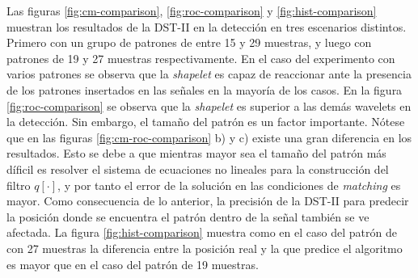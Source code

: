 Las figuras \ref{fig:cm-comparison}, \ref{fig:roc-comparison} y \ref{fig:hist-comparison} 
muestran los resultados de la DST-II en la detección en tres escenarios distintos.
Primero con un grupo de patrones de entre 15 y 29 muestras, y luego con patrones de 19 y 27 
muestras respectivamente. En el caso del experimento con varios patrones se observa que 
la \textit{shapelet} es capaz de reaccionar ante la presencia de los patrones insertados en las señales en 
la mayoría de los casos. En la figura \ref{fig:roc-comparison} se observa que la \textit{shapelet}
es superior a las demás wavelets en la detección. Sin embargo, el tamaño del patrón es un factor
importante. Nótese que en las figuras \ref{fig:cm-roc-comparison} b) y c) existe una gran diferencia
en los resultados. Esto se debe a que mientras mayor sea el tamaño del patrón más díficil es resolver
el sistema de ecuaciones no lineales para la construcción del filtro $q[\cdot]$, y por tanto el error
de la solución en las condiciones de \textit{matching} es mayor. Como consecuencia de lo anterior,
la precisión de la DST-II para predecir la posición donde se encuentra el patrón dentro de la señal también
se ve afectada. La figura \ref{fig:hist-comparison} muestra como en el caso del patrón de con 27 muestras
la diferencia entre la posición real y la que predice el algoritmo es mayor que en el caso del patrón 
de 19 muestras.

